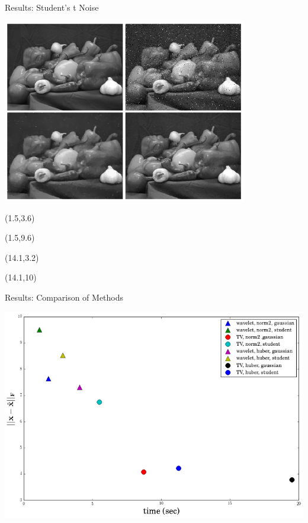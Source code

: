\documentclass[12pt]{beamer}
\begin{document}
\begin{frame}{Results: Student's t Noise}
\begin{center}
\vspace{-3 mm}
\includegraphics[width = 0.8\textwidth]{../figures/student-t_peppers.png} 
\end{center}

\begin{textblock}{5}(1.5,3.6)
\end{textblock}

\begin{textblock}{5}(1.5,9.6)
\end{textblock}

\begin{textblock}{5}(14.1,3.2)
\end{textblock}

\begin{textblock}{5}(14.1,10)
\end{textblock}

\end{frame}

\begin{frame}{Results: Comparison of Methods}
	\begin{center}
		\vspace{-3 mm}
		\includegraphics[scale=0.40]{../figures/comparePlot.png}
	\end{center}
\end{frame}
\end{document}
